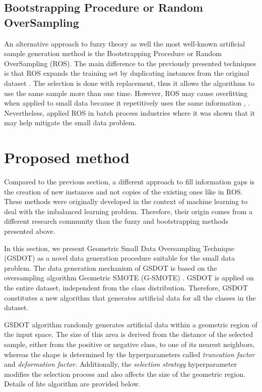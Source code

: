 \documentclass[10pt,letterpaper]{article}
\begin{document}
\subsection{Bootstrapping Procedure or Random OverSampling}

An alternative approach to fuzzy theory as well the most well-known artificial sample generation method is the Bootstrapping Procedure \cite{AbdulLateh.2017} or Random OverSampling (ROS). The main difference to the previously presented techniques is that ROS expands the training set by duplicating instances from the original dataset \cite{Efron.1993}. The selection is done with replacement, thus it allows the algorithms to use the same sample more than one time. However, ROS may cause overfitting when applied to small data because it repetitively uses the same information \cite{Tsai.2015}, \cite{Li.2018}. Nevertheless, \cite{Ivanescu.2006} applied ROS in batch process industries where it was shown that it may help mitigate the small data problem.

\section{Proposed method}
\label{proposed}

Compared to the previous section, a different approach to fill information gaps is the creation of new instances and not copies of the existing ones like in ROS. These methods were originally developed in the context of machine learning to deal with the imbalanced learning problem. Therefore, their origin comes from a different research community than the fuzzy and bootstrapping methods presented above.

In this section, we present Geometric Small Data Oversampling Technique (GSDOT) as a novel data generation procedure suitable for the small data problem. The data generation mechanism of GSDOT is based on the oversampling algorithm Geometric SMOTE (G-SMOTE) \cite{Douzas.2019}. GSDOT is applied on the entire dataset, independent from the class distribution. Therefore, GSDOT constitutes a new algorithm that generates artificial data for all the classes in the dataset.

GSDOT algorithm randomly generates artificial data within a geometric region of the input space. The size of this area is derived from the distance of the selected sample, either from the positive or negative class, to one of its nearest neighbors, whereas the shape is determined by the hyperparameters called \textit{truncation factor} and \textit{deformation factor}. Additionally, the \textit{selection strategy} hyperparameter modifies the selection process and also affects the size of the geometric region. Details of hte algorithm are provided below.
\end{document}
